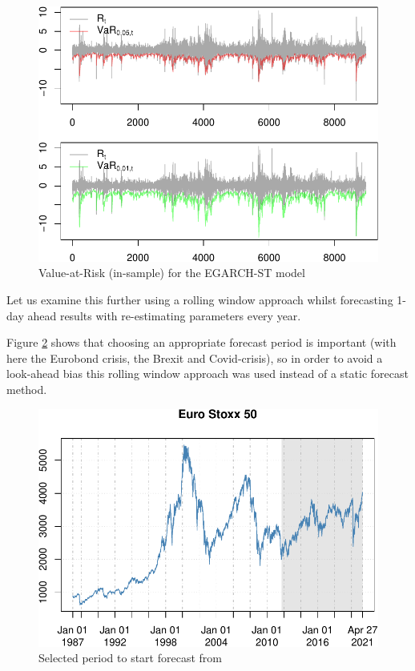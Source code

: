 \documentclass[a4paper, twoside]{templates/ociamthesis}
\begin{document}
\begin{figure}[h]

{\centering \includegraphics[width=0.6\linewidth]{_main_files/figure-latex/figVaRinsample-1} 

}

\caption{Value-at-Risk (in-sample) for the EGARCH-ST model}\label{fig:figVaRinsample}
\end{figure}

\noindent Let us examine this further using a rolling window approach whilst forecasting 1-day ahead results with re-estimating parameters every year.

\noindent Figure \ref{fig:figbacktest} shows that choosing an appropriate forecast period is important (with here the Eurobond crisis, the Brexit and Covid-crisis), so in order to avoid a look-ahead bias this rolling window approach was used instead of a static forecast method. \newpage

\begin{figure}[h]

{\centering \includegraphics[width=0.7\linewidth]{_main_files/figure-latex/figbacktest-1} 

}

\caption{Selected period to start forecast from}\label{fig:figbacktest}
\end{figure}
\end{document}
